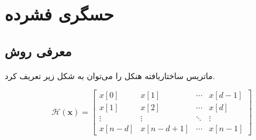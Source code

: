 \FloatBarrier
\section{حسگری فشرده}\label{ch:literature-review|sec:compressed-sensing}








\subsection{معرفی روش }\label{ch:literature-review|sec:compressed-sensing|subsec:aloha}


ماتریس ساختاریافته هنکل
را می‌توان به شکل زیر تعریف کرد.

\removevspace
\begin{equation}\label{eq:HankelStructuredMatrix}
	\mathcal{H}(\mathbf{x})=
	\left[\begin{array}{cccc}
		x[0] & x[1] & \cdots & x[d-1] \\
		x[1] & x[2] & \cdots & x[d] \\
		\vdots & \vdots & \ddots & \vdots \\
		x[n-d] & x[n-d+1] & \cdots & x[n-1]
	\end{array}\right]
\end{equation}


